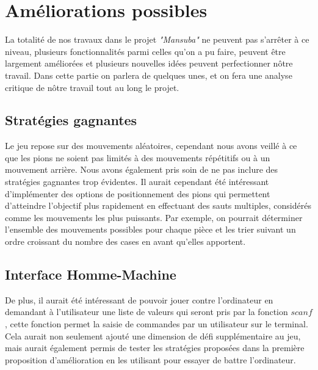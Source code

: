 \documentclass[11pt]{article}
\begin{document}
    \section{Améliorations possibles}
        La totalité de nos travaux dans le projet \textit{"Mansuba"} ne peuvent pas s'arrêter à ce niveau, plusieurs fonctionnalités parmi celles qu'on a pu faire, peuvent être largement améliorées et plusieurs nouvelles idées peuvent perfectionner nôtre travail. Dans cette partie on parlera de quelques unes, et on fera une analyse critique de nôtre travail tout au long le projet.
            \subsection{Stratégies gagnantes}
        Le jeu repose sur des mouvements aléatoires, cependant nous avons veillé à ce que les pions ne soient pas limités à des mouvements répétitifs ou à un mouvement arrière. Nous avons également pris soin de ne pas inclure des stratégies gagnantes trop évidentes. Il aurait cependant été intéressant d'implémenter des options de positionnement des pions qui permettent d'atteindre l'objectif plus rapidement en effectuant des sauts multiples, considérés comme les mouvements les plus puissants. Par exemple, on pourrait déterminer l'ensemble des mouvements possibles pour chaque pièce et les trier suivant un ordre croissant du nombre des cases en avant qu'elles apportent.
            \subsection{Interface Homme-Machine}
        De plus, il aurait été intéressant de pouvoir jouer contre l'ordinateur en demandant à l'utilisateur une liste de valeurs qui seront pris par la fonction $scanf$, cette fonction permet la saisie de commandes par un utilisateur sur le terminal. Cela aurait non seulement ajouté une dimension de défi supplémentaire au jeu, mais aurait également permis de tester les stratégies proposées dans la première proposition d'amélioration en les utilisant pour essayer de battre l'ordinateur.
\end{document}

